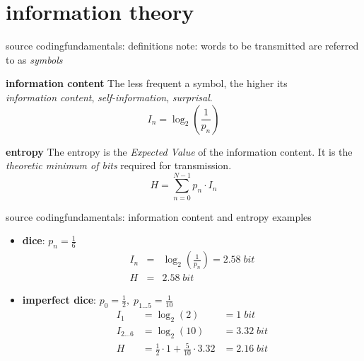\section{information theory}
	\begin{frame}{source coding}{fundamentals: definitions}
		note: words to be transmitted are referred to as \textit{symbols}
		\pause
		\begin{block}{\textbf{information content}}
			\centering
			The less frequent a symbol, the higher its\\ \textit{information content}, \textit{self-information}, \textit{surprisal}.
			\begin{equation*}
				I_n = \log_2\left(\frac{1}{p_n} \right)
			\end{equation*}
		\end{block}
		\pause
		\begin{block}{\textbf{entropy}}
			\centering
			The entropy is the \textit{Expected Value} of the information content. It is the \textit{theoretic minimum of bits} required for transmission.
			\begin{equation*}
				H = \sum\limits_{n=0}^{N-1}{p_n\cdot I_n}
			\end{equation*}
		\end{block}
	\end{frame}

	\begin{frame}{source coding}{fundamentals: information content and entropy examples}
		\begin{itemize}
			\item	\textbf{dice}: $p_n = \frac{1}{6}$
			\begin{eqnarray*}
				I_n &=& \log_2\left(\frac{1}{p_n}\right)  = 2.58\; bit\\
				H &=& 2.58\; bit %
			\end{eqnarray*}
			\pause
			\item	\textbf{imperfect dice}: $p_0 = \frac{1}{2},\; p_{1\ldots 5} = \frac{1}{10}$
			\pause
			\begin{eqnarray*}
				I_1 &=  \log_2\left(2\right)  &= 1\; bit \\
				I_{2\ldots 6} &= \log_2\left(10\right)  &= 3.32\; bit \\
				H &= \frac{1}{2}\cdot 1 + \frac{5}{10}\cdot 3.32 &= 2.16\; bit %
			\end{eqnarray*}
		\end{itemize}
	\end{frame}

